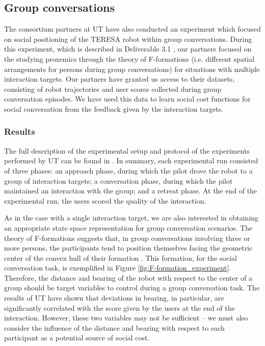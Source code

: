 \documentclass[a4paper,11pt]{report}
\begin{document}

\subsection{Group conversations}
\label{sec:group conversations}

The consortium partners at UT have also conducted an experiment which focused on social positioning of the TERESA robot within group conversations. During this experiment, which is described in Deliverable 3.1 \cite{teresa_d3.1}, our partners focused on the studying proxemics through the theory of F-formations\cite{kendon1990conducting} (i.e. different spatial arrangements for persons during group conversations) for situations with multiple interaction targets. Our partners have granted us access to their datasets, consisting of robot trajectories and user scores collected during group conversation episodes. We have used this data to learn social cost functions for social conversation from the feedback given by the interaction targets.

\subsubsection{Results}
\label{sec:group_result}

The full description of the experimental setup and protocol of the experiments performed by UT can be found in \cite{teresa_d3.1}. In summary, each experimental run consisted of three phases: an approach phase, during which the pilot drove the robot to a group of interaction targets; a conversation phase, during which the pilot maintained an interaction with the group; and a retreat phase. At the end of the experimental run, the users scored the quality of the interaction.

As in the case with a single interaction target, we are also interested in obtaining an appropriate state space representation for group conversation scenarios. The theory of F-formations suggests that, in group conversations involving three or more persons, the participants tend to position themselves facing the geometric center of the convex hull of their formation \cite{kendon1990conducting}. This formation, for the social conversation task, is exemplified in Figure \ref{fig:F-formation_experiment}. Therefore, the distance and bearing of the robot with respect to the center of a group should be target variables to control during a group conversation task. The results of UT have shown that deviations in bearing, in particular, are significantly correlated with the score given by the users at the end of the interaction. However, these two variables may not be sufficient -- we must also consider the influence of the distance and bearing with respect to each participant as a potential source of social cost.
\end{document}
